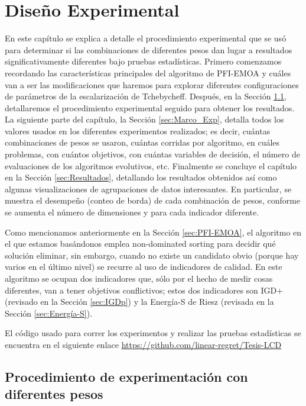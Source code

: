 
\chapter{Diseño Experimental}

En este capítulo se explica a detalle el procedimiento experimental que se usó para determinar si las combinaciones de diferentes pesos dan lugar a resultados significativamente diferentes bajo pruebas estadísticas.  Primero comenzamos recordando las características principales del algoritmo de PFI-EMOA y cuáles van a ser las modificaciones que haremos para explorar diferentes configuraciones de parámetros de la escalarización de Tchebycheff. Después, en la Sección \ref{sec:Proc_exp}, detallaremos el procedimiento experimental seguido para obtener los resultados. La siguiente parte del capítulo, la Sección \ref{sec:Marco_Exp}, detalla todos los valores usados en los diferentes experimentos realizados; es decir, cuántas combinaciones de pesos se usaron, cuántas corridas por algoritmo, en cuáles problemas, con cuántos objetivos, con cuántas variables de decisión, el número de evaluaciones de los algoritmos evolutivos, etc. Finalmente se concluye el capítulo en la Sección \ref{sec:Resultados}, detallando los resultados obtenidos así como algunas visualizaciones de agrupaciones de datos interesantes. En particular, se muestra el desempeño (conteo de borda) de cada combinación de pesos, conforme se aumenta el número de dimensiones y para cada indicador diferente. 


Como mencionamos anteriormente en la Sección \ref{sec:PFI-EMOA}, el algoritmo en el que estamos basándonos \cite{PFI} emplea non-dominated sorting para decidir qué solución eliminar, sin embargo, cuando no existe un candidato obvio (porque hay varios en el último nivel) se recurre al uso de indicadores de calidad. En este algoritmo se ocupan dos indicadores que, sólo por el hecho de medir cosas diferentes, van a tener objetivos conflictivos; estos dos indicadores son IGD+ (revisado en la Sección \ref{sec:IGDp}) y la Energía-S de Riesz (revisada en la Sección \ref{sec:Energía-S}). 

El código usado para correr los experimentos y realizar las pruebas estadísticas se encuentra en el siguiente enlace \href{https://github.com/linear-regret/Tesis-LCD}{https://github.com/linear-regret/Tesis-LCD}


\section{Procedimiento de experimentación con diferentes pesos} \label{sec:Proc_exp}

